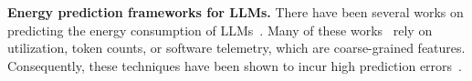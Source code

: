 \noindent\textbf{Energy prediction frameworks for LLMs.}
There have been several works on predicting the energy consumption of LLMs~\cite{strubell19,Nguyen-hotcarbon,wilkins2024offlineenergyoptimalllmserving,irene,codecarbon}. Many of these works~\cite{strubell19,Nguyen-hotcarbon,wilkins2024offlineenergyoptimalllmserving} rely on utilization, token counts, or software telemetry, which are coarse-grained features. Consequently, these techniques have been shown to incur high prediction errors~\cite{sustainlp}. 

